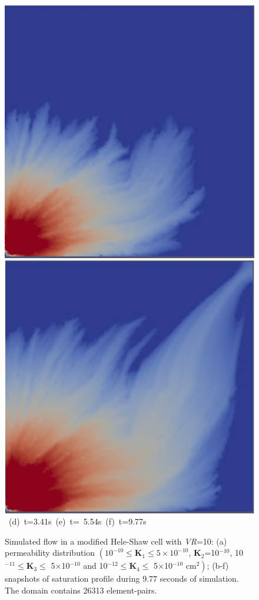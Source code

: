 \begin{landscape}
\begin{figure}[ht]
{{            \includegraphics[width=.45\textwidth]{./Pics1/Saffman_heterogeneous_VR10/ST_Heterog_VR10_D8000Hb.pdf}
            \includegraphics[width=.45\textwidth]{./Pics1/Saffman_heterogeneous_VR10/ST_Heterog_VR10_D13800Hb.pdf} }
      \hbox{\hspace{2.cm} (d) t=3.41s \hspace{3.5cm} (e) t= 5.54s\hspace{4.5cm} (f) t=9.77s }}
\caption{Simulated flow in a modified Hele-Shaw cell with {\it VR}=10: (a) permeability distribution $\left(\text{10}^{-10}\le\mathbf{K}_{1}\le\text{5}\times\text{10}^{-10}\right.$, {\bf K}$_{2}$=10$^{-10}$, 10$^{-11}\le\mathbf{K}_{3}\le$ 5$\times$10$^{-10}$ and 10$^{-12}\le\mathbf{K}_{4}\le$ 5$\times$10$\left.^{-10}\text{ cm}^{2}\right)$; (b-f) snapshots of saturation profile during 9.77 seconds of simulation. The domain contains 26313  element-pairs.}
\label{fig:HeleShawHeter_VR10}
\end{figure}
\end{landscape}
\clearpage

